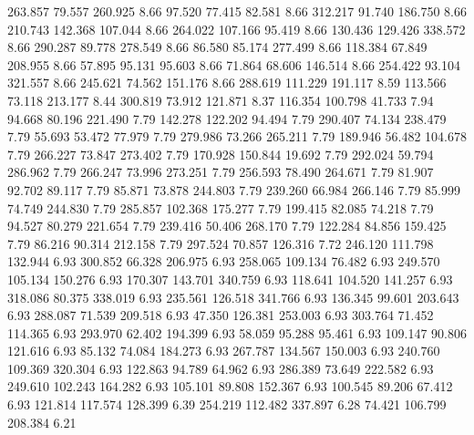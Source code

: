  263.857   79.557  260.925         8.66
  97.520   77.415   82.581         8.66
 312.217   91.740  186.750         8.66
 210.743  142.368  107.044         8.66
 264.022  107.166   95.419         8.66
 130.436  129.426  338.572         8.66
 290.287   89.778  278.549         8.66
  86.580   85.174  277.499         8.66
 118.384   67.849  208.955         8.66
  57.895   95.131   95.603         8.66
  71.864   68.606  146.514         8.66
 254.422   93.104  321.557         8.66
 245.621   74.562  151.176         8.66
 288.619  111.229  191.117         8.59
 113.566   73.118  213.177         8.44
 300.819   73.912  121.871         8.37
 116.354  100.798   41.733         7.94
  94.668   80.196  221.490         7.79
 142.278  122.202   94.494         7.79
 290.407   74.134  238.479         7.79
  55.693   53.472   77.979         7.79
 279.986   73.266  265.211         7.79
 189.946   56.482  104.678         7.79
 266.227   73.847  273.402         7.79
 170.928  150.844   19.692         7.79
 292.024   59.794  286.962         7.79
 266.247   73.996  273.251         7.79
 256.593   78.490  264.671         7.79
  81.907   92.702   89.117         7.79
  85.871   73.878  244.803         7.79
 239.260   66.984  266.146         7.79
  85.999   74.749  244.830         7.79
 285.857  102.368  175.277         7.79
 199.415   82.085   74.218         7.79
  94.527   80.279  221.654         7.79
 239.416   50.406  268.170         7.79
 122.284   84.856  159.425         7.79
  86.216   90.314  212.158         7.79
 297.524   70.857  126.316         7.72
 246.120  111.798  132.944         6.93
 300.852   66.328  206.975         6.93
 258.065  109.134   76.482         6.93
 249.570  105.134  150.276         6.93
 170.307  143.701  340.759         6.93
 118.641  104.520  141.257         6.93
 318.086   80.375  338.019         6.93
 235.561  126.518  341.766         6.93
 136.345   99.601  203.643         6.93
 288.087   71.539  209.518         6.93
  47.350  126.381  253.003         6.93
 303.764   71.452  114.365         6.93
 293.970   62.402  194.399         6.93
  58.059   95.288   95.461         6.93
 109.147   90.806  121.616         6.93
  85.132   74.084  184.273         6.93
 267.787  134.567  150.003         6.93
 240.760  109.369  320.304         6.93
 122.863   94.789   64.962         6.93
 286.389   73.649  222.582         6.93
 249.610  102.243  164.282         6.93
 105.101   89.808  152.367         6.93
 100.545   89.206   67.412         6.93
 121.814  117.574  128.399         6.39
 254.219  112.482  337.897         6.28
  74.421  106.799  208.384         6.21
